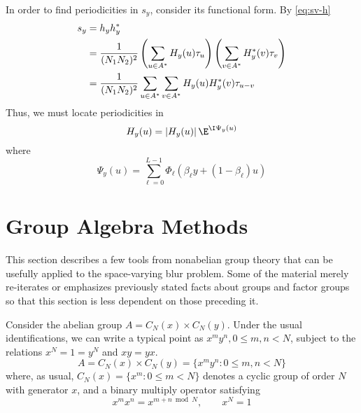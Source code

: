In order to find periodicities in $s_y$, consider its functional form.  By \ref{eq:sv-h}
\begin{align*}
s_y &=  h_y h_y^*\\
&= \frac{1}{(N_1N_2)^2} \left(\sum_{u\in A^*} H_y(u)\tau_u\right)
\left(\sum_{v\in A^*} H_y^*(v)\tau_v\right)\\
&=\frac{1}{(N_1N_2)^2}\sum_{u\in A^*} \sum_{v\in A^*} H_y(u)H_y^*(v)\tau_{u-v}
\end{align*}
Thus, we must locate periodicities in 
\[
H_y(u) = |H_y(u)|\,\E^{\I \Psi_y(u)}
\]
where 
\[
\Psi_y(u) = \sum_{\ell=0}^{L-1} \Phi_{\ell}(\beta_{\ell}y + (1-\beta_{\ell})u)
\]

\section{Group Algebra Methods}
\label{sec:group-algebra-methods}
This section describes a few tools from nonabelian group
theory that can be usefully applied to the space-varying
blur problem. Some of the material merely re-iterates or
emphasizes previously stated facts about groups and factor 
groups so that this section is less dependent on
those preceding it. 

Consider the abelian group $A = C_N(x) \times C_N(y)$.  Under the usual
identifications, we can write a typical point as $x^my^n, 0\leq m,n < N$,
subject to the relations $x^N = 1 = y^N$ and $xy = yx$.
\[
A = C_N(x) \times C_N(y) = \{x^m y^n : 0 \leq m,n < N \}
\]
where, as usual, $C_N(x) = \{x^m : 0 \leq m < N \}$ denotes a cyclic group of
order $N$ with generator $x$, and a binary multiply operator satisfying
\[
x^mx^n = x^{m+n \bmod N}, \qquad x^N=1
\]

